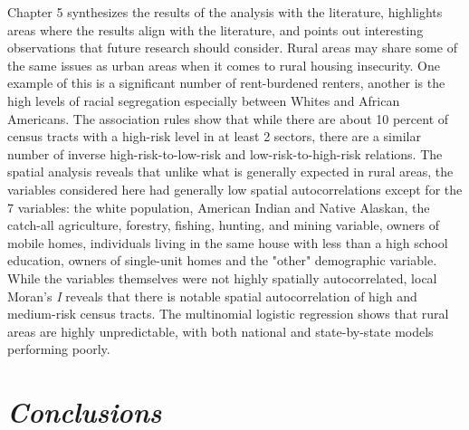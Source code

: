 Chapter 5 synthesizes the results of the analysis with the literature, highlights areas where the results align with the literature, and points out interesting observations that future research should consider. Rural areas may share some of the same issues as urban areas when it comes to rural housing insecurity. One example of this is a significant number of rent-burdened renters, another is the high levels of racial segregation especially between Whites and African Americans. The association rules show that while there are about 10 percent of census tracts with a high-risk level in at least 2 sectors, there are a similar number of inverse high-risk-to-low-risk and low-risk-to-high-risk relations. The spatial analysis reveals that unlike what is generally expected in rural areas, the variables considered here had generally low spatial autocorrelations except for the 7 variables: the white population, American Indian and Native Alaskan, the catch-all agriculture, forestry, fishing, hunting, and mining variable, owners of mobile homes, individuals living in the same house with less than a high school education, owners of single-unit homes and the "other" demographic variable. While the variables themselves were not highly spatially autocorrelated, local Moran's \textit{I} reveals that there is notable spatial autocorrelation of high and medium-risk census tracts. The multinomial logistic regression shows that rural areas are highly unpredictable, with both national and state-by-state models performing poorly. 


\section{\textit{Conclusions}}

